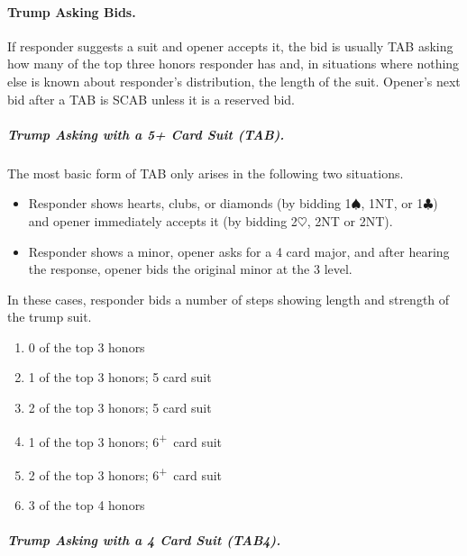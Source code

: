 \documentclass[10pt]{article}
\renewcommand{\c}{$\clubsuit$}
\newcommand{\h}{$\heartsuit$}
\newcommand{\s}{$\spadesuit$}
\newcommand{\p}{\textsuperscript{+}}
\begin{document}
\begin{multicols*}{2}
\paragraph{Trump Asking Bids.}

If responder suggests a suit and opener accepts it, the bid is usually TAB
asking how many of the top three honors responder has and, in situations where
nothing else is known about responder’s distribution, the length of the suit.
Opener’s next bid after a TAB is SCAB unless it is a reserved bid.

\subparagraph{Trump Asking with a 5+ Card Suit (TAB).}

The most basic form of TAB only arises in the following two situations.
\begin{itemize}
\item Responder shows hearts, clubs, or diamonds (by bidding 1\s, 1NT, or 1\c) and
  opener immediately accepts it (by bidding 2\h, 2NT or 2NT).
\item Responder shows a minor, opener asks for a 4 card major, and after hearing
  the response, opener bids the original minor at the 3 level.
\end{itemize}
In these cases, responder bids a number of steps showing length and strength of the trump suit.
\begin{enumerate}
\item 0 of the top 3 honors
\item 1 of the top 3 honors; 5 card suit
\item 2 of the top 3 honors; 5 card suit
\item 1 of the top 3 honors; 6\p\ card suit
\item 2 of the top 3 honors; 6\p\ card suit
\item 3 of the top 4 honors
\end{enumerate}

\subparagraph{Trump Asking with a 4 Card Suit (TAB4).}


\end{multicols*}
\end{document}
